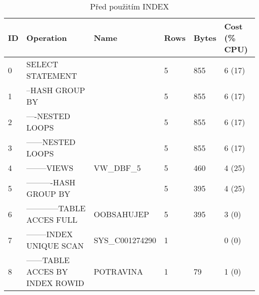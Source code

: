 \documentclass[11pt, a4paper]{article}[]
\begin{document}
    \begin{table}[h]
	\caption{Před použitím INDEX}
	\centering
	\begin{tabular}{|l|l|l|l|l|l|}
        \hline
        ID & Operation                        & Name            & Rows & Bytes & Cost (\% CPU) \\ \hline
        0  & SELECT STATEMENT                 &                 & 5    & 855   & 6 (17)        \\
        1  & --HASH GROUP BY                  &                 & 5    & 855   & 6 (17)        \\
        2  & ----NESTED LOOPS                 &                 & 5    & 855   & 6 (17)        \\
        3  & ------NESTED LOOPS               &                 & 5    & 855   & 6 (17)        \\
        4  & --------VIEWS                    & VW\_DBF\_5      & 5    & 460   & 4 (25)        \\
        5  & ----------HASH GROUP BY          &                 & 5    & 395   & 4 (25)        \\
        6  & ------------TABLE ACCES FULL     & OOBSAHUJEP      & 5    & 395   & 3 (0)         \\
        7  & --------INDEX UNIQUE SCAN        & SYS\_C001274290 & 1    &       & 0 (0)         \\
        8  & ------TABLE ACCES BY INDEX ROWID & POTRAVINA       & 1    & 79    & 1 (0)         \\ \hline
        \end{tabular}
        \end{table}    
\end{document}
